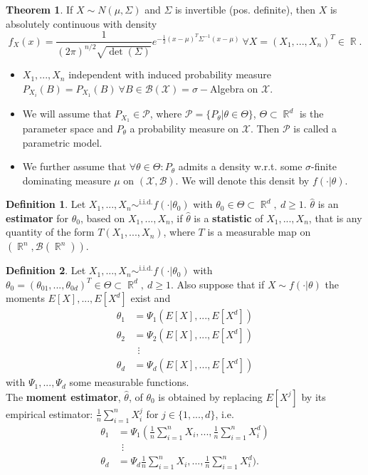 \documentclass[11pt]{article}
\theoremstyle{definition}
\DeclareMathOperator{\iid}{i.i.d.}
\DeclareMathOperator{\R}{\mathbb{R}}
\newtheorem{thm}{Theorem}
\newtheorem{defn}{Definition}
\begin{document}
\begin{thm} If $X\sim N(\mu,\Sigma)$ and $\Sigma$ is invertible (pos. definite), then $X$ is absolutely continuous with density 
\[f_X(x)=\frac{1}{(2\pi)^{n/2}\sqrt{\det(\Sigma)}}e^{-\frac{1}{2}(x-\mu)^T\Sigma^{-1}(x-\mu)}\ \forall X=(X_1,...,X_n)^T\in\R.\]
\end{thm}

\begin{itemize}
\item $X_1,...,X_n$ independent with induced probability measure $P_{X_i}(B)=P_{X_1}(B)\ \forall B\in\mathcal{B}(\mathcal{X})=\sigma-$Algebra on $\mathcal{X}$.
\item We will assume that $P_{X_1}\in\mathcal{P}$, where $\mathcal{P}=\{ P_\theta | \theta\in\Theta\}$, $\Theta\subset\R^d$ is the parameter space and $P_\theta$ a probability measure on $\mathcal{X}$. Then $\mathcal{P}$ is called a parametric model.
\item We further assume that $\forall\theta\in\Theta:P_\theta$ admits a density w.r.t. some $\sigma$-finite dominating measure $\mu$ on $(\mathcal{X},\mathcal{B})$. We will denote this densit by $f(\cdot|\theta)$.
\end{itemize}

\begin{defn}Let $X_1,...,X_n\sim^{\iid}f(\cdot|\theta_0)$ with $\theta_0\in\Theta\subset\R^d,\ d\geq 1$. $\hat{\theta}$ is an \textbf{estimator} for $\theta_0$, based on $X_1,...,X_n$, if $\hat{\theta}$ is a \textbf{statistic} of $X_1,...,X_n$, that is any quantity of the form $T(X_1,...,X_n)$, where $T$ is a measurable map on $(\R^n,\mathcal{B}(\R^n))$.
\end{defn}

\begin{defn}Let $X_1,...,X_n\sim^{\iid}f(\cdot | \theta_0)$ with $\theta_0=(\theta_{01},...,\theta_{0d})^T\in\Theta\subset\R^d,\ d\geq 1$. Also suppose that if $X\sim f(\cdot|\theta)$ the moments $E[X],...,E[X^d]$ exist and
\begin{align*}
\theta_1 &= \Psi_1(E[X],...,E[X^d])\\
\theta_2 &= \Psi_2(E[X],...,E[X^d])\\
\ &\ \ \vdots \\
\theta_d &= \Psi_d(E[X],...,E[X^d])
\end{align*}
with $\Psi_1,...,\Psi_d$ some measurable functions.\\
The \textbf{moment estimator}, $\hat{\theta}$, of $\theta_0$ is obtained by replacing $E[X^j]$ by its empirical estimator: $\frac{1}{n}\sum^n_{i=1}X^j_i$ for $j\in\{1,...,d\}$, i.e.
\begin{align*}
\theta_1 &= \Psi_1(\frac{1}{n}\sum^n_{i=1}X_i,...,\frac{1}{n}\sum^n_{i=1}X^d_i)\\
 &\ \ \vdots \\
\theta_d &= \Psi_d\frac{1}{n}\sum^n_{i=1}X_i,...,\frac{1}{n}\sum^n_{i=1}X^d_i).\\
\end{align*}
\end{defn}
\end{document}
